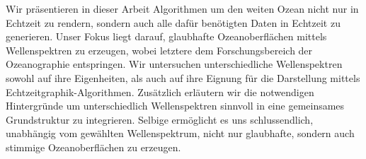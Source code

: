 \textcolor{changed}{
Wir präsentieren in dieser Arbeit Algorithmen um den weiten Ozean
nicht nur in Echtzeit zu rendern, sondern auch alle dafür benötigten
Daten in Echtzeit zu generieren. Unser Fokus liegt darauf, glaubhafte
Ozeanoberflächen mittels Wellenspektren zu erzeugen, wobei letztere dem Forschungsbereich der Ozeanographie entspringen.
Wir untersuchen unterschiedliche Wellenspektren sowohl auf ihre
Eigenheiten, als auch auf ihre Eignung für die Darstellung mittels Echtzeitgraphik-Algorithmen. Zusätzlich erläutern wir
die notwendigen Hintergründe um unterschiedlich Wellenspektren sinnvoll
in eine gemeinsames Grundstruktur zu integrieren. Selbige ermöglicht es uns
schlussendlich, unabhängig vom gewählten Wellenspektrum, nicht nur glaubhafte, sondern auch stimmige Ozeanoberflächen zu erzeugen.
} 
%


